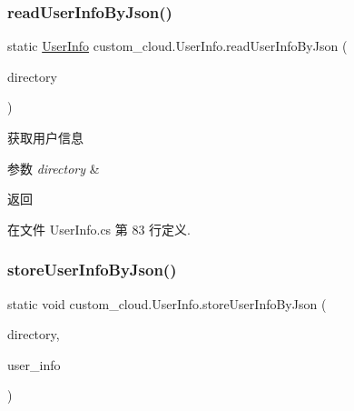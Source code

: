 \mbox{\label{classcustom__cloud_1_1_user_info_ae6ff14e98ef2b7b35cbe26f66dc7793e}} 
\subsubsection{\texorpdfstring{read\+User\+Info\+By\+Json()}{readUserInfoByJson()}}
{\footnotesize\ttfamily static \hyperlink{classcustom__cloud_1_1_user_info}{User\+Info} custom\+\_\+cloud.\+User\+Info.\+read\+User\+Info\+By\+Json (\begin{DoxyParamCaption}\item[{string}]{directory }\end{DoxyParamCaption})\hspace{0.3cm}{\ttfamily [static]}}



获取用户信息 


\begin{DoxyParams}{参数}
{\em directory} & \\
\hline
\end{DoxyParams}
\begin{DoxyReturn}{返回}

\end{DoxyReturn}


在文件 User\+Info.\+cs 第 83 行定义.

\mbox{\label{classcustom__cloud_1_1_user_info_a79ce1b1481f668ab112d2e51d46499ec}} 
\subsubsection{\texorpdfstring{store\+User\+Info\+By\+Json()}{storeUserInfoByJson()}}
{\footnotesize\ttfamily static void custom\+\_\+cloud.\+User\+Info.\+store\+User\+Info\+By\+Json (\begin{DoxyParamCaption}\item[{string}]{directory,  }\item[{\hyperlink{classcustom__cloud_1_1_user_info}{User\+Info}}]{user\+\_\+info }\end{DoxyParamCaption})\hspace{0.3cm}{\ttfamily [static]}}



